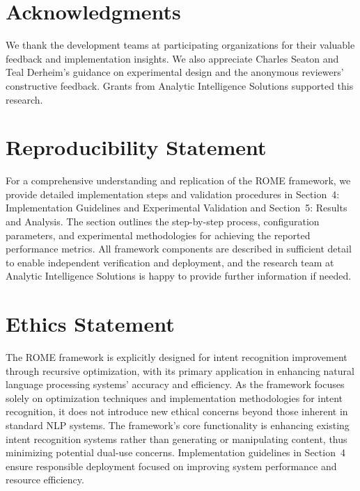 \documentclass[12pt]{article}
\begin{document}
\section*{Acknowledgments}
We thank the development teams at participating organizations for their valuable feedback and implementation insights. We also appreciate Charles Seaton and Teal Derheim's guidance on experimental design and the anonymous reviewers' constructive feedback. Grants from Analytic Intelligence Solutions supported this research.

\section*{Reproducibility Statement}
For a comprehensive understanding and replication of the ROME framework, we provide detailed implementation steps and validation procedures in Section~4: Implementation Guidelines and Experimental Validation and Section~5: Results and Analysis. The section outlines the step-by-step process, configuration parameters, and experimental methodologies for achieving the reported performance metrics. All framework components are described in sufficient detail to enable independent verification and deployment, and the research team at Analytic Intelligence Solutions is happy to provide further information if needed.

\section*{Ethics Statement}
The ROME framework is explicitly designed for intent recognition improvement through recursive optimization, with its primary application in enhancing natural language processing systems' accuracy and efficiency. As the framework focuses solely on optimization techniques and implementation methodologies for intent recognition, it does not introduce new ethical concerns beyond those inherent in standard NLP systems. The framework's core functionality is enhancing existing intent recognition systems rather than generating or manipulating content, thus minimizing potential dual-use concerns. Implementation guidelines in Section~4 ensure responsible deployment focused on improving system performance and resource efficiency.
\end{document}
